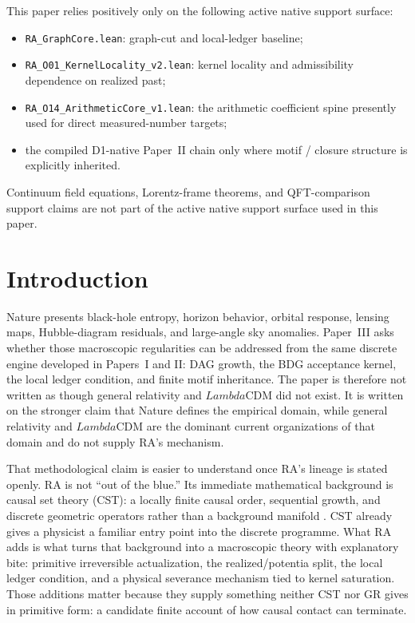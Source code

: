 \documentclass[11pt]{article}
\def\Lambda{Lambda}%
\begin{document}
\begin{tcolorbox}[title=Active Native Support Surface Used Positively,colback=gray!5,colframe=gray!60]
This paper relies positively only on the following active native support surface:
\begin{itemize}[nosep]
    \item \texttt{RA\_GraphCore.lean}: graph-cut and local-ledger baseline;
    \item \texttt{RA\_O01\_KernelLocality\_v2.lean}: kernel locality and admissibility dependence on realized past;
    \item \texttt{RA\_O14\_ArithmeticCore\_v1.lean}: the arithmetic coefficient spine presently used for direct measured-number targets;
    \item the compiled D1-native Paper~II chain only where motif / closure structure is explicitly inherited.
\end{itemize}
Continuum field equations, Lorentz-frame theorems, and QFT-comparison support claims are not part of the active native support surface used in this paper.
\end{tcolorbox}

\section{Introduction}

Nature presents black-hole entropy, horizon behavior, orbital response, lensing maps, Hubble-diagram residuals, and large-angle sky anomalies. Paper~III asks whether those macroscopic regularities can be addressed from the same discrete engine developed in Papers~I and II: DAG growth, the BDG acceptance kernel, the local ledger condition, and finite motif inheritance. The paper is therefore not written as though general relativity and $\Lambda$CDM did not exist. It is written on the stronger claim that Nature defines the empirical domain, while general relativity and $\Lambda$CDM are the dominant current organizations of that domain and do not supply RA's mechanism.

That methodological claim is easier to understand once RA's lineage is stated openly. RA is not ``out of the blue.'' Its immediate mathematical background is causal set theory (CST): a locally finite causal order, sequential growth, and discrete geometric operators rather than a background manifold \cite{Bombelli1987,Sorkin1997,Rideout2000,Benincasa2010,Dowker2013}. CST already gives a physicist a familiar entry point into the discrete programme. What RA adds is what turns that background into a macroscopic theory with explanatory bite: primitive irreversible actualization, the realized/potentia split, the local ledger condition, and a physical severance mechanism tied to kernel saturation. Those additions matter because they supply something neither CST nor GR gives in primitive form: a candidate finite account of how causal contact can terminate.
\end{document}
